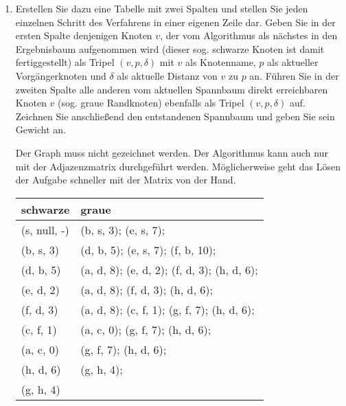 \documentclass{bschlangaul-aufgabe}
\begin{document}
\begin{enumerate}
\item Erstellen Sie dazu eine Tabelle mit zwei Spalten und stellen Sie
jeden einzelnen Schritt des Verfahrens in einer eigenen Zeile dar. Geben
Sie in der ersten Spalte denjenigen Knoten $v$, der vom Algorithmus als
nächstes in den Ergebnisbaum aufgenommen wird (dieser sog. schwarze
Knoten ist damit fertiggestellt) als Tripel $(v, p, \delta)$ mit $v$ als
Knotenname, $p$ als aktueller Vorgängerknoten und $\delta$ als aktuelle
Distanz von $v$ zu $p$ an. Führen Sie in der zweiten Spalte alle anderen
vom aktuellen Spannbaum direkt erreichbaren Knoten $v$ (sog. graue
Randknoten) ebenfalls als Tripel $(v, p, \delta)$ auf. Zeichnen Sie
anschließend den entstandenen Spannbaum und geben Sie sein Gewicht an.

\begin{liAntwort}
Der Graph muss nicht gezeichnet werden. Der Algorithmus kann auch nur
mit der Adjazenzmatrix durchgeführt werden. Möglicherweise geht das
Lösen der Aufgabe schneller mit der Matrix von der Hand.


\begin{center}
\end{center}


\begin{tabular}{ll}
\bf{schwarze} & \bf{graue} \\
\hline
(s, null, -) & (b, s, 3); (e, s, 7);  \\
(b, s, 3) & (d, b, 5); (e, s, 7); (f, b, 10);  \\
(d, b, 5) & (a, d, 8); (e, d, 2); (f, d, 3); (h, d, 6);  \\
(e, d, 2) & (a, d, 8); (f, d, 3); (h, d, 6);  \\
(f, d, 3) & (a, d, 8); (c, f, 1); (g, f, 7); (h, d, 6);  \\
(c, f, 1) & (a, c, 0); (g, f, 7); (h, d, 6);  \\
(a, c, 0) & (g, f, 7); (h, d, 6);  \\
(h, d, 6) & (g, h, 4);  \\
(g, h, 4) &   \\
\end{tabular}


\end{liAntwort}
\end{enumerate}
\end{document}
